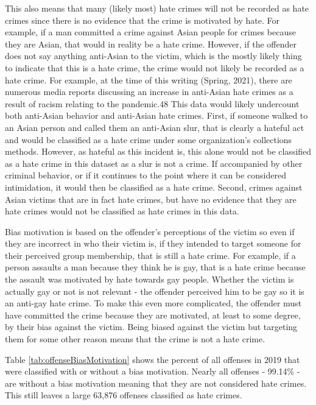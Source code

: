 \documentclass[
  12pt,
  openany]{book}
\begin{document}
This also means that many (likely most) hate crimes will not be recorded as hate crimes since there is no evidence that the crime is motivated by hate. For example, if a man committed a crime against Asian people for crimes because they are Asian, that would in reality be a hate crime. However, if the offender does not say anything anti-Asian to the victim, which is the mostly likely thing to indicate that this is a hate crime, the crime would not likely be recorded as a hate crime. For example, at the time of this writing (Spring, 2021), there are numerous media reports discussing an increase in anti-Asian hate crimes as a result of racism relating to the pandemic.48 This data would likely undercount both anti-Asian behavior and anti-Asian hate crimes. First, if someone walked to an Asian person and called them an anti-Asian slur, that is clearly a hateful act and would be classified as a hate crime under some organization's collections methods. However, as hateful as this incident is, this alone would not be classified as a hate crime in this dataset as a slur is not a crime. If accompanied by other criminal behavior, or if it continues to the point where it can be considered intimidation, it would then be classified as a hate crime. Second, crimes against Asian victims that are in fact hate crimes, but have no evidence that they are hate crimes would not be classified as hate crimes in this data.

Bias motivation is based on the offender's perceptions of the victim so even if they are incorrect in who their victim is, if they intended to target someone for their perceived group membership, that is still a hate crime. For example, if a person assaults a man because they think he is gay, that is a hate crime because the assault was motivated by hate towards gay people. Whether the victim is actually gay or not is not relevant - the offender perceived him to be gay so it is an anti-gay hate crime. To make this even more complicated, the offender must have committed the crime because they are motivated, at least to some degree, by their bias against the victim. Being biased against the victim but targeting them for some other reason means that the crime is not a hate crime.

Table \ref{tab:offenseBiasMotivation} shows the percent of all offenses in 2019 that were classified with or without a bias motivation. Nearly all offenses - 99.14\% - are without a bias motivation meaning that they are not considered hate crimes. This still leaves a large 63,876 offenses classified as hate crimes.
\end{document}
